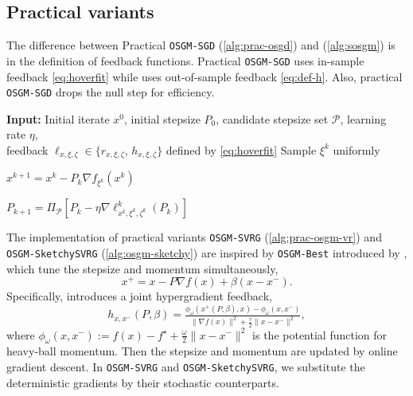 \documentclass{article}
\theoremstyle{definition}
\DeclareRobustCommand{\namerefc}[2]{\hyperref[#2]{\textcolor{#1}{\nameref*{#2}}}}
\newcommand{\osgd}{\namerefc{purple}{alg:sosgm}}
\newcommand{\assign}{:=}
\newcommand{\ovh}{\texttt{OSGM-SVRG}}
\newcommand{\osgdh}{\texttt{OSGM-SGD}}
\newcommand{\osk}{\texttt{OSGM-SketchySVRG}}
\begin{document}
\subsection{Practical variants} \label{app:exp-algs}

The difference between Practical {\osgdh} (\cref{alg:prac-osgd}) and {\osgd} (\cref{alg:sosgm}) is in the definition of feedback functions. Practical {\osgdh} uses in-sample feedback \eqref{eq:hoverfit} while {\osgd} uses out-of-sample feedback \eqref{eq:def-h}. Also, practical {\osgdh} drops the null step for efficiency.

\begin{algorithm}[ht!]
\caption{{Practical \texttt{OSGM-SGD}}}
\label{alg:prac-osgd}
\begin{algorithmic}[1]
    \STATE \textbf{Input:} Initial iterate $x^0$, initial stepsize $P_0$, candidate stepsize set $\mathcal{P}$, learning rate $\eta$, \\
    feedback $\ell_{x,\xi,\zeta} \in \{ r_{x,\xi,\zeta},\, h_{x,\xi,\zeta} \}$ defined by \eqref{eq:hoverfit}
        \STATE Sample $\xi^k$ uniformly

        \STATE 
        $x^{k+1}=x^k - P_k \nabla f_{\xi^k}(x^k)$

        \STATE 
        $P_{k+1}=\Pi_{\mathcal{P}} [P_k - \eta \nabla \ell_{x^k,\xi^k,\zeta^k}^k(P_k)]$
    \ENDFOR
\end{algorithmic}
\end{algorithm}

The implementation of practical variants {\ovh} (\cref{alg:prac-osgm-vr}) and {\osk} (\cref{alg:osgm-sketchy}) are inspired by \texttt{OSGM-Best} introduced by \cite{chu2025gradient}, which tune the stepsize and momentum simultaneously,
\[
x^+ = x - P \nabla f(x) +\beta (x - x^-).
\]
Specifically, \cite{chu2025gradient} introduces a joint hypergradient feedback,
\[
h_{x,x^-}(P,\beta) = \tfrac{\phi_{\omega}(x^+(P,\beta), x) - \phi_{\omega}(x, x^-)}{\|\nabla f(x)\|^2 + \tfrac{\tau}{2}\|x - x^-\|^2},
\]
where $\phi_{\omega}(x, x^-)\assign f(x) - f^\star + \tfrac{\omega}{2} \|x - x^-\|^2$ is the potential function for heavy-ball momentum. Then the stepsize and momentum are updated by online gradient descent. In {\ovh} and {\osk}, we substitute the deterministic gradients by their stochastic counterparts.
\end{document}
